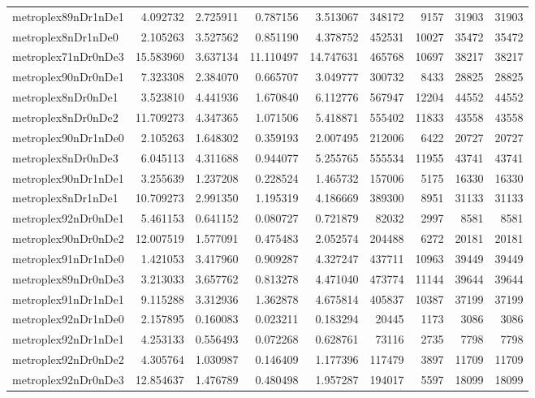\begin{longtable}{|l|r|r|r|r|r|r|r|r|}
metroplex89nDr1nDe1 & 4.092732 & 2.725911 & 0.787156 & 3.513067 & 348172 & 9157 & 31903 & 31903 \\
metroplex8nDr1nDe0 & 2.105263 & 3.527562 & 0.851190 & 4.378752 & 452531 & 10027 & 35472 & 35472 \\
metroplex71nDr0nDe3 & 15.583960 & 3.637134 & 11.110497 & 14.747631 & 465768 & 10697 & 38217 & 38217 \\
metroplex90nDr0nDe1 & 7.323308 & 2.384070 & 0.665707 & 3.049777 & 300732 & 8433 & 28825 & 28825 \\
metroplex8nDr0nDe1 & 3.523810 & 4.441936 & 1.670840 & 6.112776 & 567947 & 12204 & 44552 & 44552 \\
metroplex8nDr0nDe2 & 11.709273 & 4.347365 & 1.071506 & 5.418871 & 555402 & 11833 & 43558 & 43558 \\
metroplex90nDr1nDe0 & 2.105263 & 1.648302 & 0.359193 & 2.007495 & 212006 & 6422 & 20727 & 20727 \\
metroplex8nDr0nDe3 & 6.045113 & 4.311688 & 0.944077 & 5.255765 & 555534 & 11955 & 43741 & 43741 \\
metroplex90nDr1nDe1 & 3.255639 & 1.237208 & 0.228524 & 1.465732 & 157006 & 5175 & 16330 & 16330 \\
metroplex8nDr1nDe1 & 10.709273 & 2.991350 & 1.195319 & 4.186669 & 389300 & 8951 & 31133 & 31133 \\
metroplex92nDr0nDe1 & 5.461153 & 0.641152 & 0.080727 & 0.721879 & 82032 & 2997 & 8581 & 8581 \\
metroplex90nDr0nDe2 & 12.007519 & 1.577091 & 0.475483 & 2.052574 & 204488 & 6272 & 20181 & 20181 \\
metroplex91nDr1nDe0 & 1.421053 & 3.417960 & 0.909287 & 4.327247 & 437711 & 10963 & 39449 & 39449 \\
metroplex89nDr0nDe3 & 3.213033 & 3.657762 & 0.813278 & 4.471040 & 473774 & 11144 & 39644 & 39644 \\
metroplex91nDr1nDe1 & 9.115288 & 3.312936 & 1.362878 & 4.675814 & 405837 & 10387 & 37199 & 37199 \\
metroplex92nDr1nDe0 & 2.157895 & 0.160083 & 0.023211 & 0.183294 & 20445 & 1173 & 3086 & 3086 \\
metroplex92nDr1nDe1 & 4.253133 & 0.556493 & 0.072268 & 0.628761 & 73116 & 2735 & 7798 & 7798 \\
metroplex92nDr0nDe2 & 4.305764 & 1.030987 & 0.146409 & 1.177396 & 117479 & 3897 & 11709 & 11709 \\
metroplex92nDr0nDe3 & 12.854637 & 1.476789 & 0.480498 & 1.957287 & 194017 & 5597 & 18099 & 18099 \\

\end{longtable}
